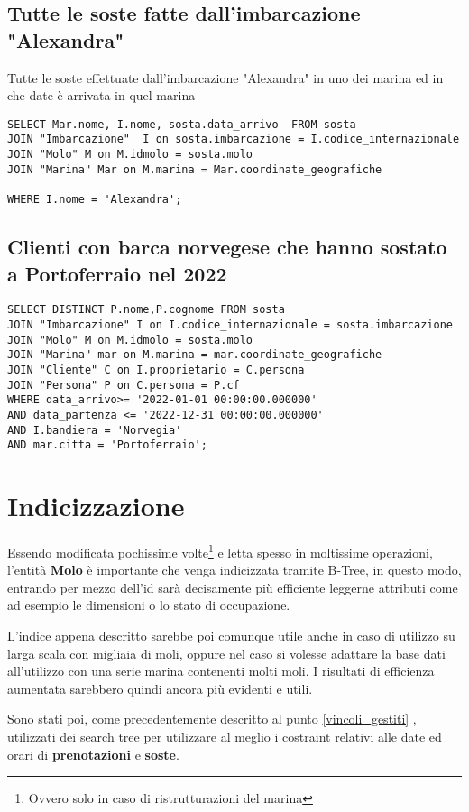 \subsection{Tutte le soste fatte dall'imbarcazione "Alexandra"}

Tutte le soste effettuate dall'imbarcazione "Alexandra" in uno dei marina ed in che date è arrivata in quel marina

\begin{lstlisting}
SELECT Mar.nome, I.nome, sosta.data_arrivo  FROM sosta
JOIN "Imbarcazione"  I on sosta.imbarcazione = I.codice_internazionale
JOIN "Molo" M on M.idmolo = sosta.molo
JOIN "Marina" Mar on M.marina = Mar.coordinate_geografiche

WHERE I.nome = 'Alexandra';
\end{lstlisting}

\subsection{Clienti con barca norvegese che hanno sostato a Portoferraio nel 2022}

\begin{lstlisting}
SELECT DISTINCT P.nome,P.cognome FROM sosta
JOIN "Imbarcazione" I on I.codice_internazionale = sosta.imbarcazione
JOIN "Molo" M on M.idmolo = sosta.molo
JOIN "Marina" mar on M.marina = mar.coordinate_geografiche
JOIN "Cliente" C on I.proprietario = C.persona
JOIN "Persona" P on C.persona = P.cf
WHERE data_arrivo>= '2022-01-01 00:00:00.000000'
AND data_partenza <= '2022-12-31 00:00:00.000000'
AND I.bandiera = 'Norvegia'
AND mar.citta = 'Portoferraio';
\end{lstlisting}

\section{Indicizzazione}

Essendo modificata pochissime volte\footnote{Ovvero solo in caso di ristrutturazioni del marina} e letta spesso in moltissime operazioni, l'entità \textbf{Molo} è importante che venga indicizzata tramite B-Tree, in questo modo, entrando per mezzo dell'id sarà decisamente più efficiente leggerne attributi come ad esempio le dimensioni o lo stato di occupazione.

L'indice appena descritto sarebbe poi comunque utile anche in caso di utilizzo su larga scala con migliaia di moli, oppure nel caso si volesse adattare la base dati all'utilizzo con una serie marina contenenti molti moli. I risultati di efficienza aumentata sarebbero quindi ancora più evidenti e utili.

Sono stati poi, come precedentemente descritto al punto \ref{vincoli_gestiti} , utilizzati dei search tree per utilizzare al meglio i costraint relativi alle date ed orari di \textbf{prenotazioni} e \textbf{soste}.
